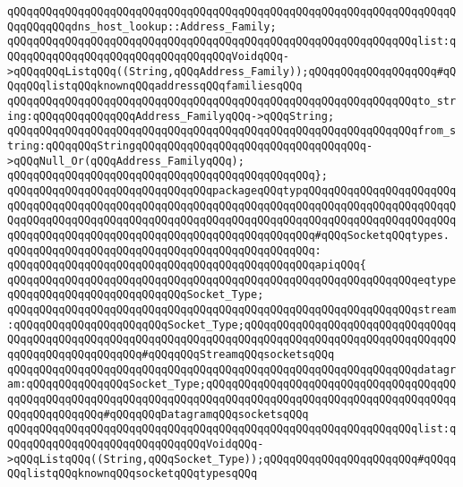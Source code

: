 \verb|qQQqqQQqqQQqqQQqqQQqqQQqqQQqqQQqqQQqqQQqqQQqqQQqqQQqqQQqqQQqqQQqqQQqqQQqqQQqqQQqdns_host_lookup::Address_Family;|\newline
\newline
\verb|qQQqqQQqqQQqqQQqqQQqqQQqqQQqqQQqqQQqqQQqqQQqqQQqqQQqqQQqqQQqqQQqlist:qQQqqQQqqQQqqQQqqQQqqQQqqQQqqQQqqQQqVoidqQQq->qQQqqQQqListqQQq((String,qQQqAddress_Family));qQQqqQQqqQQqqQQqqQQq#qQQqqQQqlistqQQqknownqQQqaddressqQQqfamiliesqQQq|\newline
\newline
\verb|qQQqqQQqqQQqqQQqqQQqqQQqqQQqqQQqqQQqqQQqqQQqqQQqqQQqqQQqqQQqqQQqto_string:qQQqqQQqqQQqqQQqAddress_FamilyqQQq->qQQqString;|\newline
\verb|qQQqqQQqqQQqqQQqqQQqqQQqqQQqqQQqqQQqqQQqqQQqqQQqqQQqqQQqqQQqqQQqfrom_string:qQQqqQQqStringqQQqqQQqqQQqqQQqqQQqqQQqqQQqqQQqqQQq->qQQqNull_Or(qQQqAddress_FamilyqQQq);|\newline
\verb|qQQqqQQqqQQqqQQqqQQqqQQqqQQqqQQqqQQqqQQqqQQqqQQq};|\newline
\newline
\verb|qQQqqQQqqQQqqQQqqQQqqQQqqQQqqQQqpackageqQQqtypqQQqqQQqqQQqqQQqqQQqqQQqqQQqqQQqqQQqqQQqqQQqqQQqqQQqqQQqqQQqqQQqqQQqqQQqqQQqqQQqqQQqqQQqqQQqqQQqqQQqqQQqqQQqqQQqqQQqqQQqqQQqqQQqqQQqqQQqqQQqqQQqqQQqqQQqqQQqqQQqqQQqqQQqqQQqqQQqqQQqqQQqqQQqqQQqqQQqqQQqqQQqqQQqqQQq#qQQqSocketqQQqtypes.|\newline
\verb|qQQqqQQqqQQqqQQqqQQqqQQqqQQqqQQqqQQqqQQqqQQqqQQq:|\newline
\verb|qQQqqQQqqQQqqQQqqQQqqQQqqQQqqQQqqQQqqQQqqQQqqQQqapiqQQq{|\newline
\verb|qQQqqQQqqQQqqQQqqQQqqQQqqQQqqQQqqQQqqQQqqQQqqQQqqQQqqQQqqQQqqQQqeqtypeqQQqqQQqqQQqqQQqqQQqqQQqqQQqSocket_Type;|\newline
\newline
\verb|qQQqqQQqqQQqqQQqqQQqqQQqqQQqqQQqqQQqqQQqqQQqqQQqqQQqqQQqqQQqqQQqstream:qQQqqQQqqQQqqQQqqQQqqQQqSocket_Type;qQQqqQQqqQQqqQQqqQQqqQQqqQQqqQQqqQQqqQQqqQQqqQQqqQQqqQQqqQQqqQQqqQQqqQQqqQQqqQQqqQQqqQQqqQQqqQQqqQQqqQQqqQQqqQQqqQQqqQQqqQQq#qQQqqQQqStreamqQQqsocketsqQQq|\newline
\verb|qQQqqQQqqQQqqQQqqQQqqQQqqQQqqQQqqQQqqQQqqQQqqQQqqQQqqQQqqQQqqQQqdatagram:qQQqqQQqqQQqqQQqSocket_Type;qQQqqQQqqQQqqQQqqQQqqQQqqQQqqQQqqQQqqQQqqQQqqQQqqQQqqQQqqQQqqQQqqQQqqQQqqQQqqQQqqQQqqQQqqQQqqQQqqQQqqQQqqQQqqQQqqQQqqQQqqQQq#qQQqqQQqDatagramqQQqsocketsqQQq|\newline
\newline
\verb|qQQqqQQqqQQqqQQqqQQqqQQqqQQqqQQqqQQqqQQqqQQqqQQqqQQqqQQqqQQqqQQqlist:qQQqqQQqqQQqqQQqqQQqqQQqqQQqqQQqVoidqQQq->qQQqListqQQq((String,qQQqSocket_Type));qQQqqQQqqQQqqQQqqQQqqQQq#qQQqqQQqlistqQQqknownqQQqsocketqQQqtypesqQQq|\newline
